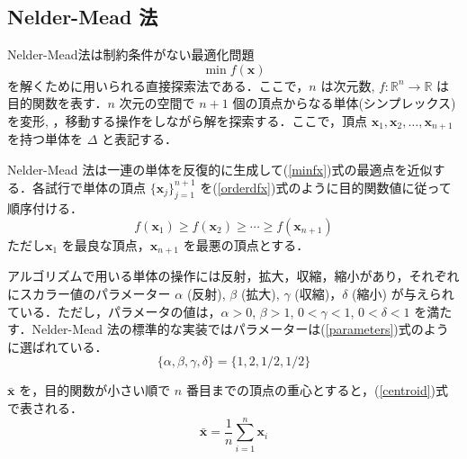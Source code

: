 \documentclass[twocolumn]{jarticle}
\begin{document}
    \subsection{Nelder-Mead 法}
    Nelder-Mead法\cite{10.1093/comjnl/7.4.308}は制約条件がない最適化問題
    \begin{equation}
        \label{minfx}
        \min f(\bm{x})
    \end{equation}
    を解くために用いられる直接探索法である\cite{gao2012implementing}．ここで，$n$ は次元数, $f: \mathbb{R}^n \rightarrow \mathbb{R}$ は目的関数を表す．$n$ 次元の空間で $n+1$ 個の頂点からなる単体(シンプレックス)を変形, ，移動する操作をしながら解を探索する．ここで，頂点 $\bm{x}_1, \bm{x}_2, \dots , \bm{x}_{n+1}$ を持つ単体を $\Delta$ と表記する． 
    
    Nelder-Mead 法は一連の単体を反復的に生成して(\ref{minfx})式の最適点を近似する．各試行で単体の頂点 $\{\bm{x}_j\}_{j=1}^{n+1}$ を(\ref{orderdfx})式のように目的関数値に従って順序付ける．
    \begin{equation}
        \label{orderdfx}
        f(\bm{x}_1) \geq f(\bm{x}_2) \geq \cdots \geq f(\bm{x}_{n+1})
    \end{equation}
    ただし$\bm{x}_1$ を最良な頂点，$\bm{x}_{n+1}$ を最悪の頂点とする．

    アルゴリズムで用いる単体の操作には反射，拡大，収縮，縮小があり，それぞれにスカラー値のパラメーター $\alpha$ (反射), $\beta$ (拡大), $\gamma$ (収縮)，$\delta$ (縮小) が与えられている．ただし，パラメータの値は，$\alpha > 0$, $\beta > 1$, $0 < \gamma < 1$, $0 < \delta < 1$ を満たす．Nelder-Mead 法の標準的な実装ではパラメーターは(\ref{parameters})式のように選ばれている．
    \begin{equation}
        \label{parameters}
        \{\alpha, \beta, \gamma, \delta\} = \{1, 2, 1/2, 1/2\}
    \end{equation}
    
    $\bar{\bm{x}}$ を，目的関数が小さい順で $n$ 番目までの頂点の重心とすると，(\ref{centroid})式で表される．
    \begin{equation}
        \label{centroid}
        \bar{\bm{x}} = \frac{1}{n}\sum_{i=1}^n\bm{x}_i
    \end{equation}
\end{document}
